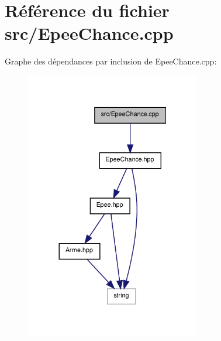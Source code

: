 \section{Référence du fichier src/\-Epee\-Chance.cpp}
\label{_epee_chance_8cpp}
Graphe des dépendances par inclusion de Epee\-Chance.\-cpp\-:\nopagebreak
\begin{figure}[H]
\begin{center}
\leavevmode
\includegraphics[width=216pt]{_epee_chance_8cpp__incl}
\end{center}
\end{figure}
